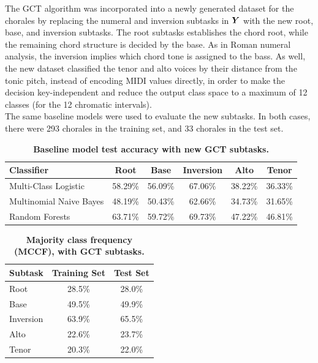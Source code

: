 \documentclass[11pt]{article}
\begin{document}
The GCT algorithm was incorporated into a newly generated dataset for the chorales by replacing the numeral and inversion subtasks in $\boldsymbol{Y}$ with the new root, base, and inversion subtasks. The root subtasks establishes the chord root, while the remaining chord structure is decided by the base. As in Roman numeral analysis, the inversion implies which chord tone is assigned to the bass. As well, the new dataset classified the tenor and alto voices by their distance from the tonic pitch, instead of encoding MIDI values directly, in order to make the decision key-independent and reduce the output class space to a maximum of 12 classes (for the 12 chromatic intervals).\\

The same baseline models were used to evaluate the new subtasks. In both cases, there were 293 chorales in the training set, and 33 chorales in the test set.

\begin{table}[h]
\begin{center}
\caption[Table caption text]{\textbf{Baseline model test accuracy with new GCT subtasks.}}
\begin{tabular}{l c c c c c}
Classifier & Root & Base & Inversion & Alto & Tenor \\ \hline
Multi-Class Logistic & 58.29\% & 56.09\% & 67.06\% & 38.22\% & 36.33\% \\
Multinomial Naive Bayes & 48.19\% & 50.43\% & 62.66\% & 34.73\% & 31.65\% \\
Random Forests & 63.71\% & 59.72\% & 69.73\% & 47.22\% & 46.81\% \\
\end{tabular}
\end{center}
\end{table}

\begin{table}[h]
\begin{center}
\caption[Table caption text]{\textbf{Majority class frequency (MCCF), with GCT subtasks.}}
\begin{tabular}{l | c c}
Subtask & Training Set & Test Set \\ \hline
Root & 28.5\% & 28.0\% \\
Base & 49.5\% & 49.9\% \\
Inversion & 63.9\% & 65.5\% \\
Alto & 22.6\% & 23.7\% \\
Tenor & 20.3\% & 22.0\%
\end{tabular}
\end{center}
\end{table}
\end{document}

